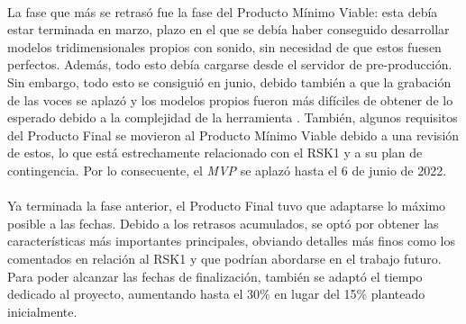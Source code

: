 \documentclass{subfiles}
\begin{document}
        \paragraph{}
        La fase que más se retrasó fue la fase del Producto Mínimo Viable: esta debía estar terminada en marzo, plazo en el que se debía haber conseguido desarrollar modelos tridimensionales propios con sonido, sin necesidad de que estos fuesen perfectos. Además, todo esto debía cargarse desde el servidor de pre-producción. Sin embargo, todo esto se consiguió en junio, debido también a que la grabación de las voces se aplazó y los modelos propios fueron más difíciles de obtener de lo esperado debido a la complejidad de la herramienta \blender. También, algunos requisitos del Producto Final se movieron al Producto Mínimo Viable debido a una revisión de estos, lo que está estrechamente relacionado con el RSK1 y a su plan de contingencia. Por lo consecuente, el \textit{MVP} se aplazó hasta el 6 de junio de 2022.

        \paragraph{}
        Ya terminada la fase anterior, el Producto Final tuvo que adaptarse lo máximo posible a las fechas. Debido a los retrasos acumulados, se optó por obtener las características más importantes principales, obviando detalles más finos como los comentados en relación al RSK1 y que podrían abordarse en el trabajo futuro. Para poder alcanzar las fechas de finalización, también se adaptó el tiempo dedicado al proyecto, aumentando hasta el 30\% en lugar del 15\% planteado inicialmente.

\end{document}
